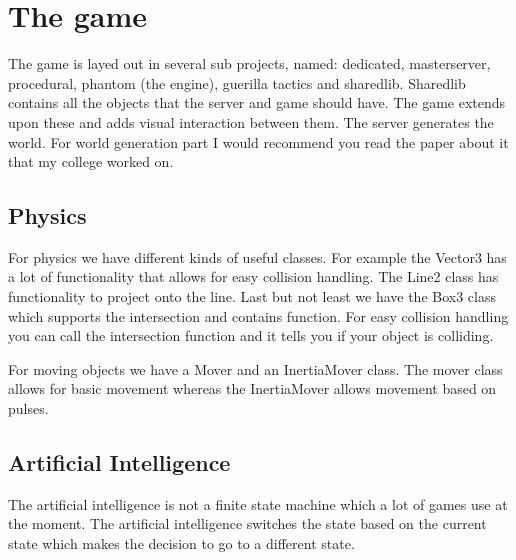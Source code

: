 \documentclass[acmtoplas,acmnow]{acmtrans2m}
\begin{document}
\section{The game}
The game is layed out in several sub projects, named: dedicated, masterserver, procedural, phantom (the engine), guerilla tactics and sharedlib. Sharedlib contains all the objects that the server and game should have. The game extends upon these and adds visual interaction between them. The server generates the world. For world generation part I would recommend you read the paper about it that my college worked on.

\subsection{Physics}
For physics we have different kinds of useful classes. For example the Vector3 has a lot of functionality that allows for easy collision handling. The Line2 class has functionality to project onto the line. Last but not least we have the Box3 class which supports the intersection and contains function. For easy collision handling you can call the intersection function and it tells you if your object is colliding.

For moving objects we have a Mover and an InertiaMover class. The mover class allows for basic movement whereas the InertiaMover allows movement based on pulses.

\subsection{Artificial Intelligence}
The artificial intelligence is not a finite state machine which a lot of games use at the moment. The artificial intelligence switches the state based on the current state which makes the decision to go to a different state.

\begin{thebibliography}{}

\end{thebibliography}

\begin{received}
\end{received}
\end{document}
